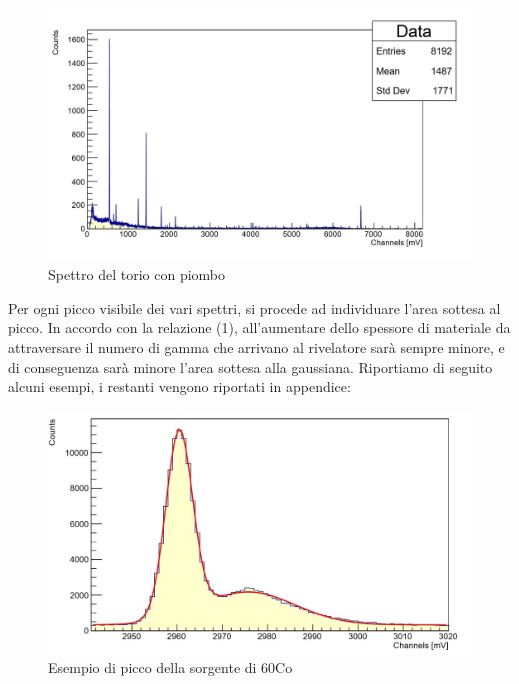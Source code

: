 \documentclass[a4paper,10pt]{article}
\begin{document}
\begin{figure}[!h]
    \centering
    \includegraphics[scale=0.6]{grafici/toriopiombo}
    \caption{Spettro del torio con piombo}
\end{figure}

\noindent Per ogni picco visibile dei vari spettri, si procede ad individuare l'area sottesa al picco.  In accordo con la relazione (1), all'aumentare dello spessore di materiale da attraversare il numero di gamma che arrivano al rivelatore sar\`a sempre minore, e di conseguenza sar\`a minore l'area sottesa alla gaussiana. Riportiamo di seguito alcuni esempi, i restanti vengono riportati in appendice:

\begin{figure}[!h]
    \centering
    \includegraphics[scale=0.6]{grafici/piccocobalto}
    \caption{Esempio di picco della sorgente di 60Co}
\end{figure}
\end{document}
